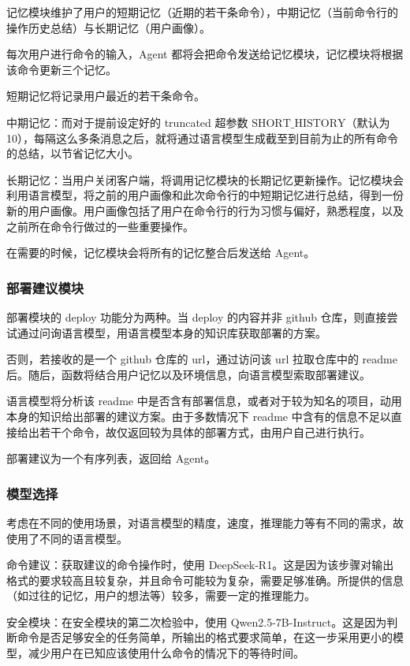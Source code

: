 \documentclass{article}
\theoremstyle{plain}
\theoremstyle{definition}
\theoremstyle{remark}
\begin{document}
记忆模块维护了用户的短期记忆（近期的若干条命令），中期记忆（当前命令行的操作历史总结）与长期记忆（用户画像）。

每次用户进行命令的输入，Agent 都将会把命令发送给记忆模块，记忆模块将根据该命令更新三个记忆。

短期记忆将记录用户最近的若干条命令。

中期记忆：而对于提前设定好的 truncated 超参数 $\text{SHORT\_HISTORY}$（默认为 10），每隔这么多条消息之后，就将通过语言模型生成截至到目前为止的所有命令的总结，以节省记忆大小。

长期记忆：当用户关闭客户端，将调用记忆模块的长期记忆更新操作。记忆模块会利用语言模型，将之前的用户画像和此次命令行的中短期记忆进行总结，得到一份新的用户画像。用户画像包括了用户在命令行的行为习惯与偏好，熟悉程度，以及之前所在命令行做过的一些重要操作。

在需要的时候，记忆模块会将所有的记忆整合后发送给 Agent。

\subsubsection{部署建议模块}

部署模块的 deploy 功能分为两种。当 deploy 的内容并非 github 仓库，则直接尝试通过问询语言模型，用语言模型本身的知识库获取部署的方案。

否则，若接收的是一个 github 仓库的 url，通过访问该 url 拉取仓库中的 readme 后。随后，函数将结合用户记忆以及环境信息，向语言模型索取部署建议。

语言模型将分析该 readme 中是否含有部署信息，或者对于较为知名的项目，动用本身的知识给出部署的建议方案。由于多数情况下 readme 中含有的信息不足以直接给出若干个命令，故仅返回较为具体的部署方式，由用户自己进行执行。

部署建议为一个有序列表，返回给 Agent。

\subsubsection{模型选择}

考虑在不同的使用场景，对语言模型的精度，速度，推理能力等有不同的需求，故使用了不同的语言模型。

命令建议：获取建议的命令操作时，使用 DeepSeek-R1。这是因为该步骤对输出格式的要求较高且较复杂，并且命令可能较为复杂，需要足够准确。所提供的信息（如过往的记忆，用户的想法等）较多，需要一定的推理能力。

安全模块：在安全模块的第二次检验中，使用 Qwen2.5-7B-Instruct。这是因为判断命令是否足够安全的任务简单，所输出的格式要求简单，在这一步采用更小的模型，减少用户在已知应该使用什么命令的情况下的等待时间。
\end{document}
